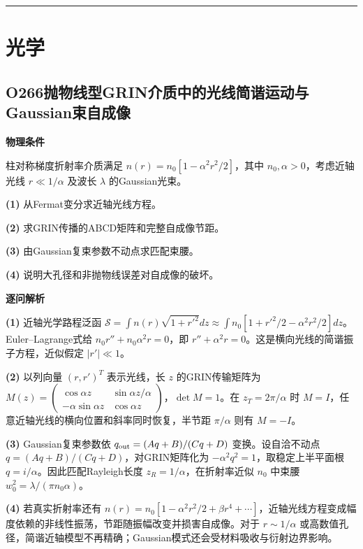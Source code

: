 \documentclass[UTF8,a4paper,11pt,oneside,openany]{ctexbook}
\begin{document}
\par\bigskip\hrule\bigskip
\chapter{光学}
\section*{O266\quad 抛物线型GRIN介质中的光线简谐运动与Gaussian束自成像}
\textbf{物理条件}\par 柱对称梯度折射率介质满足 \(n(r)=n_0[1-\alpha^2r^2/2]\)，其中 \(n_0,\alpha>0\)，考虑近轴光线 \(r\ll1/\alpha\) 及波长 \(\lambda\) 的Gaussian光束。
\par\noindent\textbf{(1)} 从Fermat变分求近轴光线方程。
\par\noindent\textbf{(2)} 求GRIN传播的ABCD矩阵和完整自成像节距。
\par\noindent\textbf{(3)} 由Gaussian复束参数不动点求匹配束腰。
\par\noindent\textbf{(4)} 说明大孔径和非抛物线误差对自成像的破坏。

\par\medskip\noindent\textbf{逐问解析}
\par\noindent\textbf{(1)} 近轴光学路程泛函 \(\mathcal S=\int n(r)\sqrt{1+r'^2}dz\approx\int n_0[1+r'^2/2-\alpha^2r^2/2]dz\)。Euler–Lagrange式给 \(n_0r''+n_0\alpha^2r=0\)，即 \(r''+\alpha^2r=0\)。这是横向光线的简谐振子方程，近似假定 \(|r'|\ll1\)。
\par\noindent\textbf{(2)} 以列向量 \((r,r')^T\) 表示光线，长 \(z\) 的GRIN传输矩阵为 \(M(z)=\begin{pmatrix}\cos\alpha z&\sin\alpha z/\alpha\\-\alpha\sin\alpha z&\cos\alpha z\end{pmatrix}\)，\(\det M=1\)。在 \(z_T=2\pi/\alpha\) 时 \(M=I\)，任意近轴光线的横向位置和斜率同时恢复，半节距 \(\pi/\alpha\) 则有 \(M=-I\)。
\par\noindent\textbf{(3)} Gaussian复束参数依 \(q_{\rm out}=(Aq+B)/(Cq+D)\) 变换。设自洽不动点 \(q=(Aq+B)/(Cq+D)\)，对GRIN矩阵化为 \(-\alpha^2q^2=1\)，取稳定上半平面根 \(q=i/\alpha\)。因此匹配Rayleigh长度 \(z_R=1/\alpha\)，在折射率近似 \(n_0\) 中束腰 \(w_0^2=\lambda/(\pi n_0\alpha)\)。
\par\noindent\textbf{(4)} 若真实折射率还有 \(n(r)=n_0[1-\alpha^2r^2/2+\beta r^4+\cdots]\)，近轴光线方程变成幅度依赖的非线性振荡，节距随振幅改变并损害自成像。对于 \(r\sim1/\alpha\) 或高数值孔径，简谐近轴模型不再精确；Gaussian模式还会受材料吸收与衍射边界影响。
\end{document}
